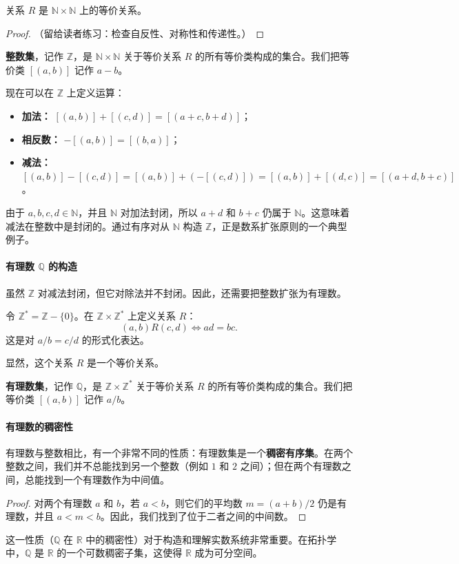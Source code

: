 \begin{theorem}
关系 $R$ 是 $\mathbb{N}\times \mathbb{N}$ 上的等价关系。
\end{theorem}
\begin{proof}
（留给读者练习：检查自反性、对称性和传递性。）
\end{proof}

\begin{definition}[整数 $\mathbb{Z}$]
\textbf{整数集}，记作 $\mathbb{Z}$，是 $\mathbb{N}\times \mathbb{N}$ 关于等价关系 $R$ 的所有等价类构成的集合。我们把等价类 $[(a,b)]$ 记作 $a-b$。
\end{definition}

现在可以在 $\mathbb{Z}$ 上定义运算：
\begin{definition}
\begin{itemize}
    \item \textbf{加法：} $[(a,b)]+[(c,d)]=[(a+c,b+d)]$；
    \item \textbf{相反数：} $-[(a,b)]=[(b,a)]$；
    \item \textbf{减法：} $[(a,b)]-[(c,d)]=[(a,b)]+(-[(c,d)])=[(a,b)]+[(d,c)]=[(a+d,b+c)]$。
\end{itemize}
\end{definition}
由于 $a,b,c,d\in \mathbb{N}$，并且 $\mathbb{N}$ 对加法封闭，所以 $a+d$ 和 $b+c$ 仍属于 $\mathbb{N}$。这意味着减法在整数中是封闭的。通过有序对从 $\mathbb{N}$ 构造 $\mathbb{Z}$，正是数系扩张原则的一个典型例子。

\paragraph{有理数 $\mathbb{Q}$ 的构造}
虽然 $\mathbb{Z}$ 对减法封闭，但它对除法并不封闭。因此，还需要把整数扩张为有理数。

\begin{definition}
令 $\mathbb{Z}^*=\mathbb{Z}-\{0\}$。在 $\mathbb{Z}\times \mathbb{Z}^*$ 上定义关系 $R$：
\[
(a,b)R(c,d)\iff ad=bc.
\]
这是对 $a/b=c/d$ 的形式化表达。
\end{definition}
显然，这个关系 $R$ 是一个等价关系。

\begin{definition}
\textbf{有理数集}，记作 $\mathbb{Q}$，是 $\mathbb{Z}\times \mathbb{Z}^*$ 关于等价关系 $R$ 的所有等价类构成的集合。我们把等价类 $[(a,b)]$ 记作 $a/b$。
\end{definition}

\paragraph{有理数的稠密性}
有理数与整数相比，有一个非常不同的性质：有理数集是一个\textbf{稠密有序集}。在两个整数之间，我们并不总能找到另一个整数（例如 $1$ 和 $2$ 之间）；但在两个有理数之间，总能找到一个有理数作为中间值。
\begin{proof}
对两个有理数 $a$ 和 $b$，若 $a<b$，则它们的平均数 $m=(a+b)/2$ 仍是有理数，并且 $a<m<b$。因此，我们找到了位于二者之间的中间数。
\end{proof}
这一性质（$\mathbb{Q}$ 在 $\mathbb{R}$ 中的稠密性）对于构造和理解实数系统非常重要。在拓扑学中，$\mathbb{Q}$ 是 $\mathbb{R}$ 的一个可数稠密子集，这使得 $\mathbb{R}$ 成为可分空间。

